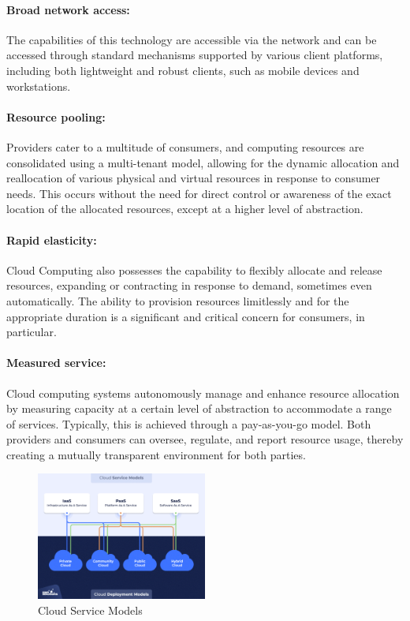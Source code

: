 \documentclass{article}
\begin{document}
\paragraph{Broad network access:} The capabilities of this technology are accessible via the network and can be accessed through standard mechanisms supported by various client platforms, including both lightweight and robust clients, such as mobile devices and workstations.

\paragraph{Resource pooling:}  Providers cater to a multitude of consumers, and computing resources are consolidated using a multi-tenant model, allowing for the dynamic allocation and reallocation of various physical and virtual resources in response to consumer needs. This occurs without the need for direct control or awareness of the exact location of the allocated resources, except at a higher level of abstraction.

\paragraph{Rapid elasticity:}  Cloud Computing also possesses the capability to flexibly allocate and release resources, expanding or contracting in response to demand, sometimes even automatically. The ability to provision resources limitlessly and for the appropriate duration is a significant and critical concern for consumers, in particular.

\paragraph{Measured service:} Cloud computing systems autonomously manage and enhance resource allocation by measuring capacity at a certain level of abstraction to accommodate a range of services. Typically, this is achieved through a pay-as-you-go model. Both providers and consumers can oversee, regulate, and report resource usage, thereby creating a mutually transparent environment for both parties.

\begin{figure}[H]
\centering
\includegraphics[width=0.5\textwidth]{images/csm.png}
\caption{\label{fig2}Cloud Service Models}
\end{figure}
\end{document}
